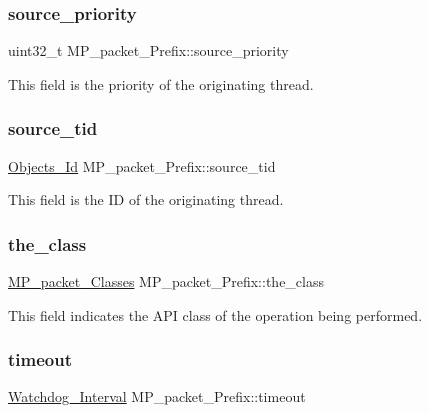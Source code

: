 \subsubsection{\texorpdfstring{source\_priority}{source\_priority}}
{\footnotesize\ttfamily uint32\+\_\+t M\+P\+\_\+packet\+\_\+\+Prefix\+::source\+\_\+priority}

This field is the priority of the originating thread. \mbox{\label{structMP__packet__Prefix_a2758e97db714485e542c8796c360ca14}} 
\subsubsection{\texorpdfstring{source\_tid}{source\_tid}}
{\footnotesize\ttfamily \mbox{\hyperlink{group__RTEMSScoreObject_ga5821f52a51072941bdd603e542d0863e}{Objects\+\_\+\+Id}} M\+P\+\_\+packet\+\_\+\+Prefix\+::source\+\_\+tid}

This field is the ID of the originating thread. \mbox{\label{structMP__packet__Prefix_aa63f1be2ef161f20c0913de59200f048}} 
\subsubsection{\texorpdfstring{the\_class}{the\_class}}
{\footnotesize\ttfamily \mbox{\hyperlink{group__RTEMSScoreMPPacket_gafed9717210f8917e5acb8e63f2c6bac3}{M\+P\+\_\+packet\+\_\+\+Classes}} M\+P\+\_\+packet\+\_\+\+Prefix\+::the\+\_\+class}

This field indicates the A\+PI class of the operation being performed. \mbox{\label{structMP__packet__Prefix_abbc308af42b7b3619fb3e72e4c9b2264}} 
\subsubsection{\texorpdfstring{timeout}{timeout}}
{\footnotesize\ttfamily \mbox{\hyperlink{group__RTEMSScoreWatchdog_gaa1834fd7531ca9bb5c4ca6fd990388d5}{Watchdog\+\_\+\+Interval}} M\+P\+\_\+packet\+\_\+\+Prefix\+::timeout}

